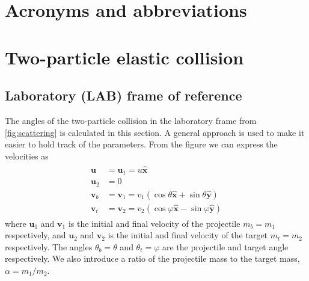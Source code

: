 \documentclass[twoside,english]{uiofysmaster/uiofysmaster}
\let\orgautoref\autoref
\renewcommand{\autoref}
        {%
		 \def\sectionautorefname{Section}%
		 \def\subsectionautorefname{Section}%
		 \def\subsubsectionautorefname{Section}%
		 \def\chapterautorefname{Chapter}%
          \orgautoref}
\begin{document}
\begin{appendices}

\chapter{Acronyms and abbreviations}

\begin{table}[ht] 
	\centering 
	
	\label{tab:acro}
\end{table}



\chapter{Two-particle elastic collision}\label{ch:scattering}
\section{Laboratory (LAB) frame of reference}\label{sec:LAB}
The angles of the two-particle collision in the laboratory frame from \autoref{fig:scattering} is calculated in this section. 
A general approach is used to make it easier to hold track of the parameters. 
From the figure we can express the velocities as
\begin{align}\label{eq:2p-LAB-collision}
\begin{split}
	 \boldsymbol{u} &= \boldsymbol{u}_1 = u \boldsymbol{\hat{x}}  \\
	 \boldsymbol{u}_2 &= 0  \\
	 \boldsymbol{v}_b &= \boldsymbol{v}_1 = v_1 (\cos \theta \boldsymbol{\hat{x}} + \sin \theta \boldsymbol{\hat{y}})  \\
	\boldsymbol{v}_t &= \boldsymbol{v}_2 = v_2 (\cos \varphi \boldsymbol{\hat{x}} - \sin \varphi \boldsymbol{\hat{y}})
\end{split}
\end{align}
where $\boldsymbol{u}_1$ and $\boldsymbol{v}_1$ is the initial and final velocity of the projectile $m_b = m_1$ respectively, and $\boldsymbol{u}_2$ and $\boldsymbol{v}_2$ is the initial and final velocity of the target $m_t = m_2$ respectively. The angles $\theta_b = \theta$ and $\theta_t = \varphi$ are the projectile and target angle respectively. We also introduce a ratio of the projectile mass to the target mass, $\alpha = m_1/m_2$.


\end{appendices}
\end{document}

